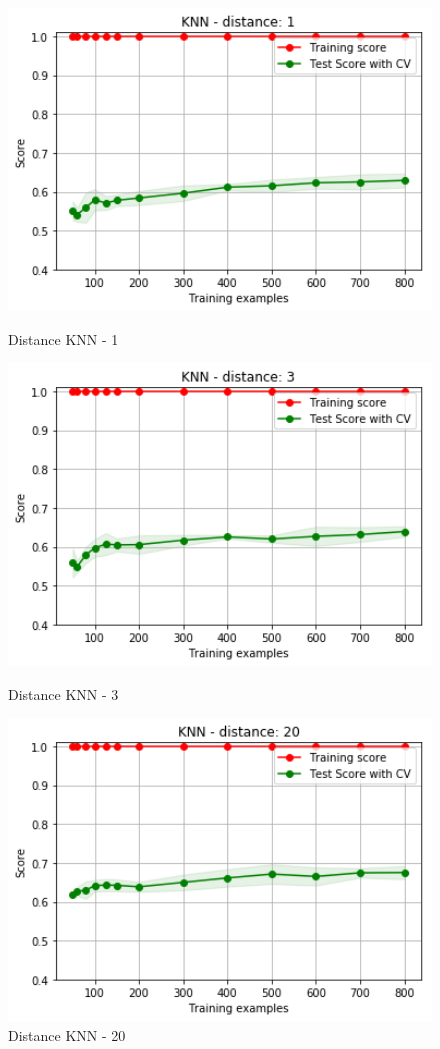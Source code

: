 \documentclass[h]{article}
\begin{document}
\begin{figure}[H]
      \includegraphics[width=1\textwidth,keepaspectratio]{2_knn_1_2.png} 
      \caption*{Distance KNN - 1} 
   \endminipage\hfill
      \includegraphics[width=1\textwidth,keepaspectratio]{2_knn_3_2.png} 
      \caption*{Distance KNN - 3} 
   \endminipage\hfill
      \includegraphics[width=1\textwidth,keepaspectratio]{2_knn_20_2.png} 
      \caption*{Distance KNN - 20} 
   \endminipage\hfill
\end{figure}
\end{document}
